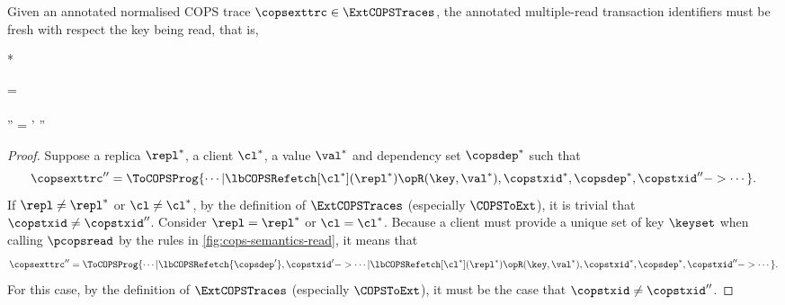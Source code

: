 \begin{toappendix}
\label{sec:proof-multiple-read-trans-id-unique}
\begin{proposition}
\label{prop:cops-read-id-unique}
Given an annotated normalised COPS trace \( \copsexttrc \in \ExtCOPSTraces \),
the annotated multiple-read transaction identifiers must be fresh with respect the key being read,
that is,
\begin{Formulae}*
\begin{Formula}
\copsexttrc = 
        \\ \land
        \Forall{\repl^* \in \COPSReplicas | \cl^* \in \Clients | \val^* \in \Values | \copsdep^* \in \COPSDependencies }
        \\ \copsexttrc'' = 
        \implies  \copstxid' \neq \copstxid''
\end{Formula}
\end{Formulae}
\end{proposition}
\begin{proof}
Suppose a replica \( \repl^* \), a client \( \cl^* \), a value \( \val^* \) and dependency set \( \copsdep^* \)
such that
\[
\copsexttrc'' = \ToCOPSProg{\cdots | \lbCOPSRefetch[\cl^*](\repl^*){\opR(\key,\val^*), \copstxid^*, \copsdep^* }, \copstxid'' -> \cdots }.
\]
If \( \repl \neq \repl^*\) or \( \cl \neq \cl^* \), 
by the definition of \(\ExtCOPSTraces\) (especially \(\COPSToExt\)), it is trivial that \(\copstxid \neq \copstxid''\).
Consider \( \repl = \repl^*\) or \( \cl = \cl^* \).
Because a client must provide a unique set of key \( \keyset \) when calling \( \pcopsread \)
by the rules in \cref{fig:cops-semantics-read},
it means that
\[
\copsexttrc'' = \ToCOPSProg{\cdots | \lbCOPSRefetch{ \copsdep' }, \copstxid'
    -> \cdots | \lbCOPSRefetch[\cl^*](\repl^*){\opR(\key,\val^*), \copstxid^*, \copsdep^* }, \copstxid'' -> \cdots }.
\]
For this case, by the definition of \(\ExtCOPSTraces\) (especially \(\COPSToExt\)), 
it must be the case that \(\copstxid \neq \copstxid''\).
\end{proof}
\end{toappendix}


